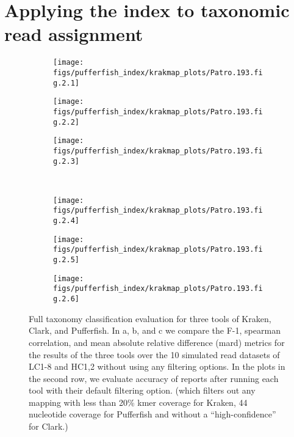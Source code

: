 \section{Applying the \pufferfish index to taxonomic read assignment}
\label{sec:read_assign}
\begin{figure*}
  \centering
  \begin{subfigure}[b]{0.33\linewidth}
    \texttt{[image: figs/pufferfish\_index/krakmap\_plots/Patro.193.fig.2.1]}
    \caption{\label{sfig:nofilt_f1}}
  \end{subfigure}
  \begin{subfigure}[b]{0.33\linewidth}
    \texttt{[image: figs/pufferfish\_index/krakmap\_plots/Patro.193.fig.2.2]}
    \caption{\label{sfig:nofilt_spear}}
  \end{subfigure}%
  \begin{subfigure}[b]{0.33\linewidth}
    \texttt{[image: figs/pufferfish\_index/krakmap\_plots/Patro.193.fig.2.3]}
    \caption{\label{sfig:nofilt_mard}}
  \end{subfigure}\\
  \vspace{0.1in}
  \begin{subfigure}[b]{0.33\linewidth}
    \texttt{[image: figs/pufferfish\_index/krakmap\_plots/Patro.193.fig.2.4]}
    \caption{\label{sfig:filt_f1}}
  \end{subfigure}
  \begin{subfigure}[b]{0.33\linewidth}
    \texttt{[image: figs/pufferfish\_index/krakmap\_plots/Patro.193.fig.2.5]}
    \caption{\label{sfig:filt_spear}}
  \end{subfigure}
  \begin{subfigure}[b]{0.33\linewidth}
    \texttt{[image: figs/pufferfish\_index/krakmap\_plots/Patro.193.fig.2.6]}
    \caption{\label{sfig:filt_mard}}
  \end{subfigure}
  \caption{
  {\small Full taxonomy classification evaluation for three tools of Kraken,
  Clark, and Pufferfish. In a, b, and c we compare the F-1, spearman correlation, and
  mean absolute relative difference (mard) metrics for the results
  of the three tools over the 10 simulated read datasets of LC1-8 and HC1,2
  without using any filtering options. In the plots in
  the second row, we evaluate accuracy of reports after running each tool
  with their default filtering option. (which filters out any mapping with less than
  20\% kmer coverage for Kraken, 44
  nucleotide coverage for Pufferfish and without a ``high-confidence'' for
  Clark.)}}
  \label{fig:taxClass}
  \vspace{-0.2in}
\end{figure*}

